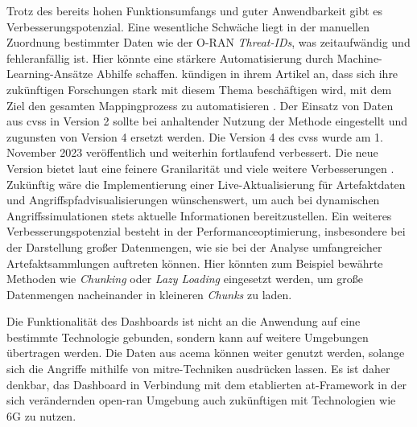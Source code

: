 Trotz des bereits hohen Funktionsumfangs und guter Anwendbarkeit gibt es Verbesserungspotenzial. Eine wesentliche Schwäche liegt in der manuellen Zuordnung bestimmter Daten wie der O-RAN \textit{Threat-IDs}, was zeitaufwändig und fehleranfällig ist. Hier könnte eine stärkere Automatisierung durch Machine-Learning-Ansätze Abhilfe schaffen. \citeauthor{klementSecuring6GTransition2024} kündigen in ihrem Artikel an, dass sich ihre zukünftigen Forschungen stark mit diesem Thema beschäftigen wird, mit dem Ziel den gesamten Mappingprozess zu automatisieren \autocite{klementSecuring6GTransition2024}. Der Einsatz von Daten aus \gls{cvss} in Version 2 sollte bei anhaltender Nutzung der Methode eingestellt und zugunsten von Version 4 ersetzt werden. Die Version 4 des \gls{cvss} wurde am 1. November 2023 veröffentlich und weiterhin fortlaufend verbessert. Die neue Version bietet laut \citeauthor{dugalAnnouncingCVSSV40} eine feinere Granilarität und viele weitere Verbesserungen \autocite{dugalAnnouncingCVSSV40}. Zukünftig wäre die Implementierung einer Live-Aktualisierung für Artefaktdaten und Angriffspfadvisualisierungen wünschenswert, um auch bei dynamischen Angriffssimulationen stets aktuelle Informationen bereitzustellen. Ein weiteres Verbesserungspotenzial besteht in der Performanceoptimierung, insbesondere bei der Darstellung großer Datenmengen, wie sie bei der Analyse umfangreicher Artefaktsammlungen auftreten können. Hier könnten zum Beispiel bewährte Methoden wie \textit{Chunking} oder \textit{Lazy Loading} eingesetzt werden, um große Datenmengen nacheinander in kleineren \textit{Chunks} zu laden.
\par Die Funktionalität des Dashboards ist nicht an die Anwendung auf eine bestimmte Technologie gebunden, sondern kann auf weitere Umgebungen übertragen werden. Die Daten aus \gls{acema} können weiter genutzt werden, solange sich die Angriffe mithilfe von \gls{mitre}-Techniken ausdrücken lassen. Es ist daher denkbar, das Dashboard in Verbindung mit dem etablierten \gls{at}-Framework in der sich verändernden \gls{open-ran} Umgebung auch zukünftigen mit Technologien wie 6G zu nutzen.
